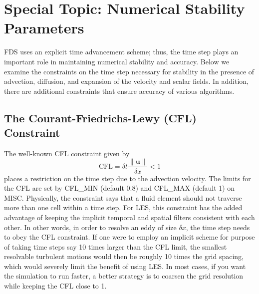 \documentclass[11pt]{book}
\begin{document}
\section{Special Topic: Numerical Stability Parameters}
\label{info:CFL}

FDS uses an explicit time advancement scheme; thus, the time step plays an important role in maintaining numerical stability and accuracy. Below we examine the constraints on the time step necessary for stability in the presence of advection, diffusion, and expansion of the velocity and scalar fields. In addition, there are additional constraints that ensure accuracy of various algorithms.

\subsection{The Courant-Friedrichs-Lewy (CFL) Constraint}

The well-known CFL constraint given by
\begin{equation}
\mbox{CFL} = \delta t \frac{\|\mathbf{u}\|}{\delta x} < 1
\end{equation}
places a restriction on the time step due to the advection velocity.  The limits for the CFL are set by {\ct CFL\_MIN} (default 0.8) and {\ct CFL\_MAX} (default 1) on {\ct MISC}. Physically, the constraint says that a fluid element should not traverse more than one cell within a time step. For LES, this constraint has the added advantage of keeping the implicit temporal and spatial filters consistent with each other. In other words, in order to resolve an eddy of size $\delta x$, the time step needs to obey the CFL constraint. If one were to employ an implicit scheme for purpose of taking time steps say 10 times larger than the CFL limit, the smallest resolvable turbulent motions would then be roughly 10 times the grid spacing, which would severely limit the benefit of using LES.  In most cases, if you want the simulation to run faster, a better strategy is to coarsen the grid resolution while keeping the CFL close to 1.
\end{document}
